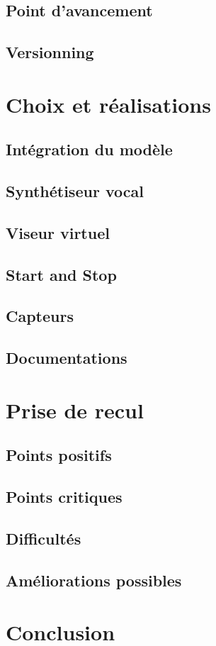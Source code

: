 \documentclass[UTF8]{EPURapport}
\begin{document}
\section{Point d'avancement}

\section{Versionning}

\chapter{Choix et réalisations}

\section{Intégration du modèle}

\section{Synthétiseur vocal}

\section{Viseur virtuel}

\section{Start and Stop}

\section{Capteurs}

\section{Documentations}

\chapter{Prise de recul}

\section{Points positifs}

\section{Points critiques}

\section{Difficultés}

\section{Améliorations possibles}

\chapter{Conclusion}

\annexes
\end{document}
